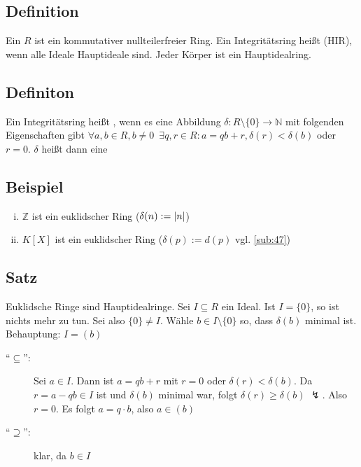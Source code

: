 \subsection[Definition Integritätsring und Hauptidealring]{Definition} %
\label{sub:98}
Ein  $R$ ist ein kommutativer nullteilerfreier Ring. Ein Integritätsring heißt  (HIR), wenn alle Ideale Hauptideale sind.  
Jeder Körper ist ein Hauptidealring.

\subsection[Definition: Euklidischer Ring und Gradfunktion]{Definiton} %
\label{sub:99}
Ein Integritätsring heißt , wenn es eine Abbildung $\delta : R \setminus \{0\} \to \mathds{N}$ mit folgenden Eigenschaften gibt 
$\forall a,b \in R, b \not= 0 \enspace\exists q,r \in R : a= qb +r , \delta (r) < \delta (b)$ oder $r =0$.
$\delta $ heißt dann eine  

\subsection[Beispiel für euklidische Ringe]{Beispiel} %
\label{sub:910}
\begin{enumerate}[(i)]
	\item $\mathds{Z}$ ist ein euklidscher Ring ($\delta (n) := \abs*{n} $)
	\item $K[X]$ ist ein euklidscher Ring ($\delta (p) := d(p)$ vgl. \ref{sub:47}) 
\end{enumerate}

\subsection[Satz: Euklidische Ringe sind Hauptidealringe]{Satz} %
\label{sub:911}
Euklidsche Ringe sind Hauptidealringe.
Sei $I \subseteq R$ ein Ideal. Ist $I= \{0\}$, so ist nichts mehr zu tun. Sei also $\{0\} \not= I$. Wähle $b \in I \setminus \{0\}$ so, dass $\delta (b)$ minimal ist.
Behauptung: $I= (b)$ 
\begin{description}
	\item[\enquote{$\subseteq$}:] Sei $a \in I$. Dann ist $a = qb +r$ mit $r=0$ oder $\delta (r) < \delta (b)$. Da $r= a- qb \in I$ ist und $\delta (b)$ minimal war, folgt
	$\delta (r) \ge \delta (b)$ {\large $\lightning$}. Also $r=0$. Es folgt $a= q \cdot b$, also $a \in (b)$
	\item[\enquote{$\supseteq$}:] klar, da $b \in I$ \bewende 
\end{description}

